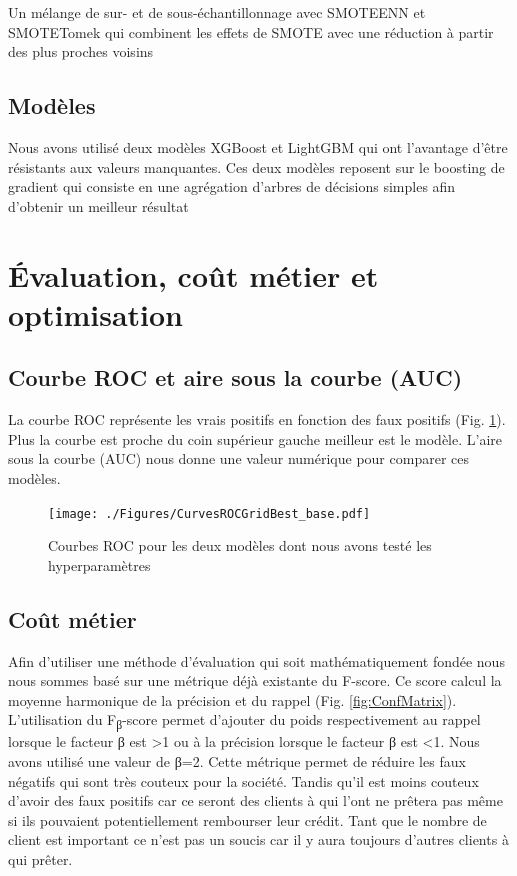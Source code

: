 \documentclass[12pt, a4paper]{article}
\begin{document}
Un mélange de sur- et de sous-échantillonnage avec SMOTEENN et SMOTETomek qui combinent les effets de SMOTE avec une réduction à partir des plus proches voisins

\subsection{Modèles}

Nous avons utilisé deux modèles XGBoost et LightGBM qui ont l'avantage d'être résistants aux valeurs manquantes. Ces deux modèles reposent sur le boosting de gradient qui consiste en une agrégation d'arbres de décisions simples afin d'obtenir un meilleur résultat

\section{Évaluation, coût métier et optimisation}

\subsection{Courbe ROC et aire sous la courbe (AUC)}

La courbe ROC représente les vrais positifs en fonction des faux positifs (Fig. \ref{fig:ROCCurves}).
Plus la courbe est proche du coin supérieur gauche meilleur est le modèle.
L'aire sous la courbe (AUC) nous donne une valeur numérique pour comparer ces modèles.

\begin{figure}[h]
    \begin{center}
        \texttt{[image: ./Figures/CurvesROCGridBest\_base.pdf]}
    \end{center}
    \caption{Courbes ROC pour les deux modèles dont nous avons testé les hyperparamètres}
    \label{fig:ROCCurves}
\end{figure}

\subsection{Coût métier}

Afin d'utiliser une méthode d'évaluation qui soit mathématiquement fondée nous nous sommes basé sur une métrique déjà existante du F-score.
Ce score calcul la moyenne harmonique de la précision et du rappel (Fig. \ref{fig:ConfMatrix}).
L'utilisation du F\textsubscript{β}-score permet d'ajouter du poids respectivement au rappel lorsque le facteur β est \num{>1} ou à la précision lorsque le facteur β est \num{<1}.
Nous avons utilisé une valeur de β=2.
Cette métrique permet de réduire les faux négatifs qui sont très couteux pour la société. Tandis qu'il est moins couteux d'avoir des faux positifs car ce seront des clients à qui l'ont ne prêtera pas même si ils pouvaient potentiellement rembourser leur crédit.
Tant que le nombre de client est important ce n'est pas un soucis car il y aura toujours d'autres clients à qui prêter.
\end{document}
